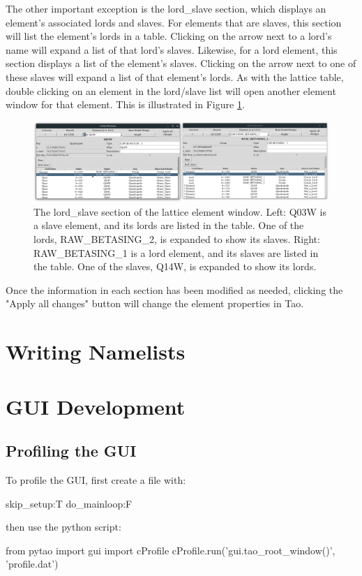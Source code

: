 The other important exception is the lord_slave section, which displays an element's associated lords and slaves.
For elements that are slaves, this section will list the element's lords in a table.
Clicking on the arrow next to a lord's name will expand a list of that lord's slaves.
Likewise, for a lord element, this section displays a list of the element's slaves.
Clicking on the arrow next to one of these slaves will expand a list of that element's lords.
As with the lattice table, double clicking on an element in the lord/slave list will open another element window for that element.
This is illustrated in Figure \ref{fig:gui.lat.element.lordslave}.
\begin{figure}
\centering
\includegraphics[width=12cm]{figures/lat_lord_slave.png}
\caption{The lord_slave section of the lattice element window.
Left: Q03W is a slave element, and its lords are listed in the table.
One of the lords, RAW_BETASING_2, is expanded to show its slaves.
Right: RAW_BETASING_1 is a lord element, and its slaves are listed in the table.
One of the slaves, Q14W, is expanded to show its lords.}
\label{fig:gui.lat.element.lordslave}
\end{figure}

Once the information in each section has been modified as needed, clicking the "Apply all changes" button will change the element properties in Tao.


\section{Writing Namelists}
\label{s:gui.namelist}


\section{GUI Development} 
\label{s:develop}

\subsection{Profiling the GUI} 
\label{s:prfile}

To profile the GUI, first create a  file with:
\begin{example}
  skip_setup:T
  do_mainloop:F
\end{example}

then use the python script:
\begin{example}
  from pytao import gui
  import cProfile
  cProfile.run('gui.tao_root_window()', 'profile.dat')
\end{example}


